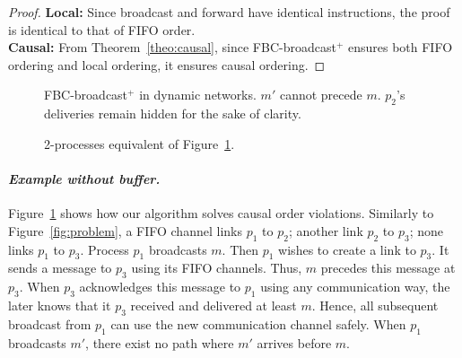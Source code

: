 \begin{proof}
  \textbf{Local:} Since broadcast and forward have identical instructions, the
  proof is identical to that of FIFO order. \\
  \textbf{Causal:} From Theorem~\ref{theo:causal}, since FBC-broadcast$^+$
  ensures both FIFO ordering and local ordering, it ensures causal ordering.
\end{proof}

\begin{figure}
  \begin{center}
    
    \caption{\label{fig:solved}FBC-broadcast$^+$ in dynamic networks. $m'$
      cannot precede $m$. $p_2$'s deliveries remain hidden for the sake of
      clarity.}
  \end{center}
\end{figure}

\begin{figure}
  \begin{center}
    
    \caption{\label{fig:eq2solved}2-processes equivalent of Figure~\ref{fig:solved}.}
  \end{center}
\end{figure}

\paragraph{\emph{Example without buffer.}} Figure~\ref{fig:solved} shows how our
algorithm solves causal order violations. Similarly to Figure~\ref{fig:problem},
a FIFO channel links $p_1$ to $p_2$; another link $p_2$ to $p_3$; none links
$p_1$ to $p_3$. Process $p_1$ broadcasts $m$. Then $p_1$ wishes to create a link
to $p_3$. It sends a message to $p_3$ using its FIFO channels. Thus, $m$
precedes this message at $p_3$. When $p_3$ acknowledges this message to $p_1$
using any communication way, the later knows that it $p_3$ received and
delivered at least $m$. Hence, all subsequent broadcast from $p_1$ can use the
new communication channel safely. When $p_1$ broadcasts $m'$, there exist no
path where $m'$ arrives before $m$.

